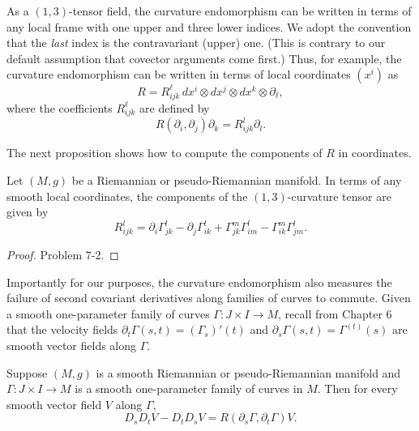 As a $(1,3)$-tensor field, the curvature endomorphism can be written in terms of any local frame with one upper and three lower indices. We adopt the convention that the \emph{last} index is the contravariant (upper) one. (This is contrary to our default assumption that covector arguments come first.) Thus, for example, the curvature endomorphism can be written in terms of local coordinates $(x^i)$ as
$$R = R_{ijk}^\ell \, dx^i \otimes dx^j \otimes dx^k \otimes \partial_\ell,$$
where the coefficients $R_{ijk}^\ell$ are defined by
\[
R(\partial_i, \partial_j) \partial_k = R_{ijk}^l \partial_l.
\]

The next proposition shows how to compute the components of $R$ in coordinates.

\begin{proposition}
\label{prop:curvature-tensor-components}
Let $(M, g)$ be a Riemannian or pseudo-Riemannian manifold. In terms of any smooth local coordinates, the components of the $(1,3)$-curvature tensor are given by
\begin{equation}
R_{ijk}^l = \partial_i \Gamma_{jk}^l - \partial_j \Gamma_{ik}^l + \Gamma_{jk}^m \Gamma_{im}^l - \Gamma_{ik}^m \Gamma_{jm}^l. \tag{7.4}
\end{equation}
\end{proposition}

\begin{proof}
Problem 7-2.
\end{proof}

Importantly for our purposes, the curvature endomorphism also measures the failure of second covariant derivatives along families of curves to commute. Given a smooth one-parameter family of curves $\Gamma: J \times I \to M$, recall from Chapter 6 that the velocity fields $\partial_t \Gamma(s,t) = (\Gamma_s)'(t)$ and $\partial_s \Gamma(s,t) = \Gamma^{(t)}(s)$ are smooth vector fields along $\Gamma$.

\begin{proposition}
\label{prop:curvature-commutator-failure}
Suppose $(M,g)$ is a smooth Riemannian or pseudo-Riemannian manifold and $\Gamma: J \times I \to M$ is a smooth one-parameter family of curves in $M$. Then for every smooth vector field $V$ along $\Gamma$,
\[
D_s D_t V - D_t D_s V = R(\partial_s \Gamma, \partial_t \Gamma) V.
\]
\end{proposition}

